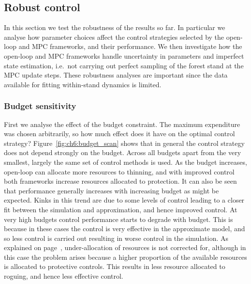 \FloatBarrier
\subsection{Robust control}\label{sec:ch6:robust}

In this section we test the robustness of the results so far. In particular we analyse how parameter choices affect the control strategies selected by the open-loop and MPC frameworks, and their performance. We then investigate how the open-loop and MPC frameworks handle uncertainty in parameters and imperfect state estimation, i.e.\ not carrying out perfect sampling of the forest stand at the MPC update steps. These robustness analyses are important since the data available for fitting within-stand dynamics is limited.

\subsubsection{Budget sensitivity}

First we analyse the effect of the budget constraint. The maximum expenditure was chosen arbitrarily, so how much effect does it have on the optimal control strategy? Figure~\ref{fig:ch6:budget_scan} shows that in general the control strategy does not depend strongly on the budget. Across all budgets apart from the very smallest, largely the same set of control methods is used. As the budget increases, open-loop can allocate more resources to thinning, and with improved control both frameworks increase resources allocated to protection. It can also be seen that performance generally increases with increasing budget as might be expected. Kinks in this trend are due to some levels of control leading to a closer fit between the simulation and approximation, and hence improved control. At very high budgets control performance starts to degrade with budget. This is because in these cases the control is very effective in the approximate model, and so less control is carried out resulting in worse control in the simulation. As explained on page~\pageref{sec:ch6:lifting}, under-allocation of resources is not corrected for, although in this case the problem arises because a higher proportion of the available resources is allocated to protective controls. This results in less resource allocated to roguing, and hence less effective control.

